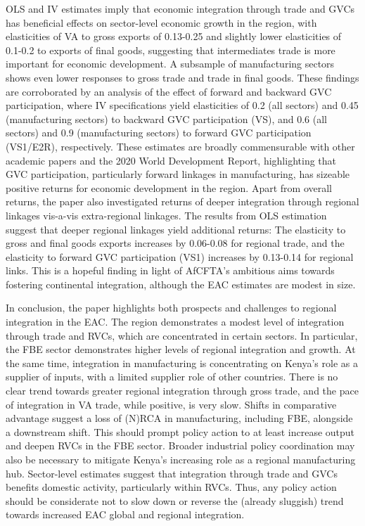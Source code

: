 \documentclass[a4paper]{article}
\begin{document}
OLS and IV estimates imply that economic integration through trade and GVCs has beneficial effects on sector-level economic growth in the region, with elasticities of VA to gross exports of 0.13-0.25 and slightly lower elasticities of 0.1-0.2 to exports of final goods, suggesting that intermediates trade is more important for economic development. A subsample of manufacturing sectors shows even lower responses to gross trade and trade in final goods. These findings are corroborated by an analysis of the effect of forward and backward GVC participation, where IV specifications yield elasticities of 0.2 (all sectors) and 0.45 (manufacturing sectors) to backward GVC participation (VS), and 0.6 (all sectors) and 0.9 (manufacturing sectors) to forward GVC participation (VS1/E2R), respectively. These estimates are broadly commensurable with other academic papers and the 2020 World Development Report, highlighting that GVC participation, particularly forward linkages in manufacturing, has sizeable positive returns for economic development in the region. Apart from overall returns, the paper also investigated returns of deeper integration through regional linkages vis-a-vis extra-regional linkages. The results from OLS estimation suggest that deeper regional linkages yield additional returns: The elasticity to gross and final goods exports increases by 0.06-0.08 for regional trade, and the elasticity to forward GVC participation (VS1) increases by 0.13-0.14 for regional links. This is a hopeful finding in light of AfCFTA's ambitious aims towards fostering continental integration, although the EAC estimates are modest in size.  \newline

In conclusion, the paper highlights both prospects and challenges to regional integration in the EAC. The region demonstrates a modest level of integration through trade and RVCs, which are concentrated in certain sectors. In particular, the FBE sector demonstrates higher levels of regional integration and growth. At the same time, integration in manufacturing is concentrating on Kenya's role as a supplier of inputs, with a limited supplier role of other countries. There is no clear trend towards greater regional integration through gross trade, and the pace of integration in VA trade, while positive, is very slow. Shifts in comparative advantage suggest a loss of (N)RCA in manufacturing, including FBE, alongside a downstream shift. This should prompt policy action to at least increase output and deepen RVCs in the FBE sector. Broader industrial policy coordination may also be necessary to mitigate Kenya's increasing role as a regional manufacturing hub. Sector-level estimates suggest that integration through trade and GVCs benefits domestic activity, particularly within RVCs. Thus, any policy action should be considerate not to slow down or reverse the (already sluggish) trend towards increased EAC global and regional integration. \newline 
\end{document}
